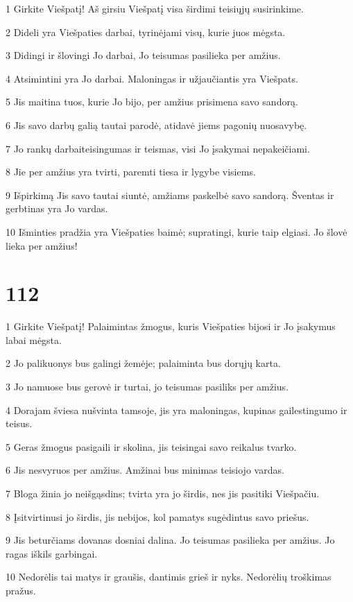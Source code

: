 \par 1 Girkite Viešpatį! Aš girsiu Viešpatį visa širdimi teisiųjų susirinkime. 
\par 2 Dideli yra Viešpaties darbai, tyrinėjami visų, kurie juos mėgsta. 
\par 3 Didingi ir šlovingi Jo darbai, Jo teisumas pasilieka per amžius. 
\par 4 Atsimintini yra Jo darbai. Maloningas ir užjaučiantis yra Viešpats. 
\par 5 Jis maitina tuos, kurie Jo bijo, per amžius prisimena savo sandorą. 
\par 6 Jis savo darbų galią tautai parodė, atidavė jiems pagonių nuosavybę. 
\par 7 Jo rankų darbai­teisingumas ir teismas, visi Jo įsakymai nepakeičiami. 
\par 8 Jie per amžius yra tvirti, paremti tiesa ir lygybe visiems. 
\par 9 Išpirkimą Jis savo tautai siuntė, amžiams paskelbė savo sandorą. Šventas ir gerbtinas yra Jo vardas. 
\par 10 Išminties pradžia yra Viešpaties baimė; supratingi, kurie taip elgiasi. Jo šlovė lieka per amžius!


\chapter{112}


\par 1 Girkite Viešpatį! Palaimintas žmogus, kuris Viešpaties bijosi ir Jo įsakymus labai mėgsta. 
\par 2 Jo palikuonys bus galingi žemėje; palaiminta bus dorųjų karta. 
\par 3 Jo namuose bus gerovė ir turtai, jo teisumas pasiliks per amžius. 
\par 4 Dorajam šviesa nušvinta tamsoje, jis yra maloningas, kupinas gailestingumo ir teisus. 
\par 5 Geras žmogus pasigaili ir skolina, jis teisingai savo reikalus tvarko. 
\par 6 Jis nesvyruos per amžius. Amžinai bus minimas teisiojo vardas. 
\par 7 Bloga žinia jo neišgąsdins; tvirta yra jo širdis, nes jis pasitiki Viešpačiu. 
\par 8 Įsitvirtinusi jo širdis, jis nebijos, kol pamatys sugėdintus savo priešus. 
\par 9 Jis beturčiams dovanas dosniai dalina. Jo teisumas pasilieka per amžius. Jo ragas iškils garbingai. 
\par 10 Nedorėlis tai matys ir graušis, dantimis grieš ir nyks. Nedorėlių troškimas pražus.


